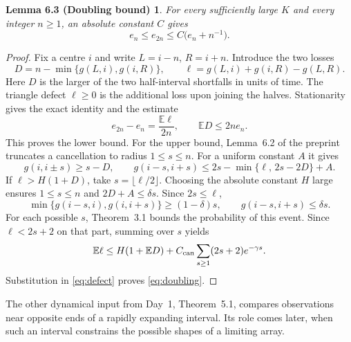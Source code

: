 \documentclass[11pt,a4paper]{article}
\newcommand{\EE}{\mathbb{E}}
\newtheorem*{doubling}{Lemma 6.3 (Doubling bound)}
\begin{document}
\begin{doubling}
For every sufficiently large $K$ and every integer $n\ge1$, an absolute
constant $C$ gives
\begin{equation}\label{eq:doubling}
 \boxed{\qquad e_n\le e_{2n}\le C\bigl(e_n+n^{-1}\bigr).\qquad}
\end{equation}
\end{doubling}
\begin{proof}
Fix a centre $i$ and write $L=i-n$, $R=i+n$. Introduce the two losses
\[
 D=n-\min\{g(L,i),g(i,R)\},\qquad
 \ell=g(L,i)+g(i,R)-g(L,R).
\]
Here $D$ is the larger of the two half-interval shortfalls in units of time.
The triangle defect $\ell\ge0$ is the additional loss upon joining the halves.
Stationarity gives the exact identity and the estimate
\begin{equation}\label{eq:defect}
 e_{2n}-e_n=\frac{\EE\ell}{2n},\qquad \EE D\le 2ne_n .
\end{equation}
This proves the lower bound. For the upper bound, Lemma~6.2 of the preprint
truncates a cancellation to radius $1\le s\le n$. For a uniform constant $A$ it gives
\[
 g(i,i\pm s)\ge s-D,\qquad
 g(i-s,i+s)\le 2s-\min\{\ell,\,2s-2D\}+A.
\]
If $\ell>H(1+D)$, take $s=\lfloor\ell/2\rfloor$. Choosing the absolute constant
$H$ large ensures $1\le s\le n$ and $2D+A\le\delta s$. Since $2s\le\ell$,
\[
 \min\{g(i-s,i),g(i,i+s)\}\ge(1-\delta)s,\qquad g(i-s,i+s)\le\delta s.
\]
For each possible $s$, Theorem~3.1 bounds the probability of this event.
Since $\ell<2s+2$ on that part, summing over $s$ yields
\[
 \EE\ell \le H(1+\EE D)+C_{\rm can}\sum_{s\ge1}(2s+2)e^{-\gamma s}.
\]
Substitution in \eqref{eq:defect} proves \eqref{eq:doubling}.
\end{proof}

The other dynamical input from Day~1, Theorem~5.1, compares observations near
opposite ends of a rapidly expanding interval. Its role comes later, when such
an interval constrains the possible shapes of a limiting array.

\newpage
\end{document}
